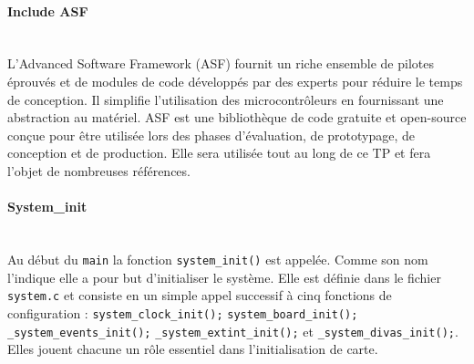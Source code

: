 \documentclass[a4paper]{article}
\begin{document}
\paragraph{Include ASF}
~~\\
L'Advanced Software Framework (ASF) fournit un riche ensemble de pilotes éprouvés et de modules de code développés par des experts pour réduire le temps de conception. Il simplifie l'utilisation des microcontrôleurs en fournissant une abstraction au matériel. ASF est une bibliothèque de code gratuite et open-source conçue pour être utilisée lors des phases d'évaluation, de prototypage, de conception et de production. Elle sera utilisée tout au long de ce TP et fera l'objet de nombreuses références.

\paragraph{System\_init}
~~\\
Au début du \texttt{main} la fonction \texttt{system\_init()} est appelée. Comme son nom l'indique elle a pour but d'initialiser le système. Elle est définie dans le fichier \texttt{system.c} et consiste en un simple appel successif à cinq fonctions de configuration : 	 
	\texttt{system\_clock\_init();}
	 \texttt{system\_board\_init();}
	 \texttt{\_system\_events\_init();}
	 \texttt{\_system\_extint\_init();}
	 et  \texttt{\_system\_divas\_init();}.
Elles jouent chacune un rôle essentiel dans l'initialisation de carte.
\end{document}
